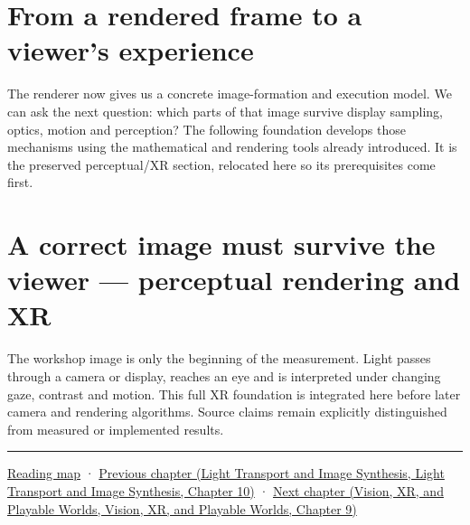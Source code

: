 \section{From a rendered frame to a viewer's experience}\label{04-visual-computing-ii-ch041-from-a-rendered-frame-to-a-viewers-experience}

The renderer now gives us a concrete image-formation and execution model. We can ask the next question: which parts of that image survive display sampling, optics, motion and perception? The following foundation develops those mechanisms using the mathematical and rendering tools already introduced. It is the preserved perceptual/XR section, relocated here so its prerequisites come first.

\section{A correct image must survive the viewer --- perceptual rendering and XR}\label{04-visual-computing-ii-ch041-a-correct-image-must-survive-the-viewer-perceptual-rendering-and-xr}

The workshop image is only the beginning of the measurement. Light passes through a camera or display, reaches an eye and is interpreted under changing gaze, contrast and motion. This full XR foundation is integrated here before later camera and rendering algorithms. Source claims remain explicitly distinguished from measured or implemented results.

\begin{center}\rule{0.5\linewidth}{0.5pt}\end{center}

\hyperref[volume-reading-map]{Reading map} · \href{../04-Light-Transport-and-Image-Synthesis/main.pdf\#nameddest=04-visual-computing-ii-ch040-lighting-reconstruction-and-surface-motion}{Previous chapter (Light Transport and Image Synthesis, Light Transport and Image Synthesis, Chapter 10)} · \href{../07-Vision-XR-and-Playable-Worlds/main.pdf\#nameddest=04-visual-computing-ii-ch042-xr-radiometry-optics-and-perception}{Next chapter (Vision, XR, and Playable Worlds, Vision, XR, and Playable Worlds, Chapter 9)}
